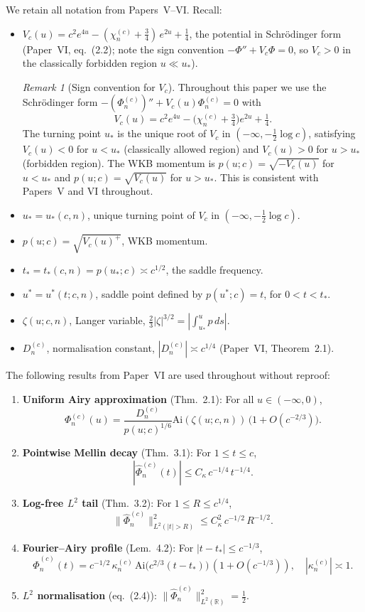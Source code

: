 \documentclass[12pt,a4paper]{amsart}
\theoremstyle{definition}
\theoremstyle{remark}
\newtheorem{remark}[theorem]{Remark}
\newcommand{\Ai}{\mathrm{Ai}}
\newcommand{\ustar}{u_*}
\newcommand{\usaddle}{u^*}
\newcommand{\tstar}{t_*}
\begin{document}
We retain all notation from Papers~V--VI.
Recall:
\begin{itemize}
\item $V_c(u) = c^2 e^{4u}
- (\chi_n^{(c)} + \tfrac{3}{4})\,e^{2u}
+ \tfrac{1}{4}$,
the potential in Schr\"odinger form
(Paper~VI, eq.~(2.2);
note the sign convention
$-\Phi'' + V_c \Phi = 0$,
so $V_c > 0$ in the classically
forbidden region $u \ll \ustar$).

\begin{remark}[Sign convention for $V_c$]
\label{rem:sign}
Throughout this paper we use the
Schr\"odinger form
$-(\Phi_n^{(c)})'' + V_c(u)\Phi_n^{(c)} = 0$
with
\[
V_c(u) = c^2 e^{4u}
- \bigl(\chi_n^{(c)} + \tfrac{3}{4}\bigr)e^{2u}
+ \tfrac{1}{4}.
\]
The turning point $\ustar$ is the unique root
of $V_c$ in $(-\infty, -\tfrac{1}{2}\log c)$,
satisfying $V_c(u) < 0$ for $u < \ustar$
(classically allowed region)
and $V_c(u) > 0$ for $u > \ustar$
(forbidden region).
The WKB momentum is
$p(u;c) = \sqrt{-V_c(u)}$
for $u < \ustar$
and $p(u;c) = \sqrt{V_c(u)}$
for $u > \ustar$.
This is consistent with
Papers~V and VI throughout.
\end{remark}
\item $\ustar = \ustar(c,n)$, unique turning point
of $V_c$ in $(-\infty, -\tfrac12\log c)$.
\item $p(u;c) = \sqrt{V_c(u)^+}$, WKB momentum.
\item $\tstar = t_*(c,n) = p(\ustar;c) \asymp c^{1/2}$,
the saddle frequency.
\item $\usaddle = \usaddle(t;c,n)$, saddle point
defined by $p(\usaddle;c) = t$, for
$0 < t < \tstar$.
\item $\zeta(u;c,n)$, Langer variable,
$\tfrac{2}{3}|\zeta|^{3/2}
= |\int_{\ustar}^u p\,ds|$.
\item $D_n^{(c)}$, normalisation constant,
$|D_n^{(c)}| \asymp c^{1/4}$
(Paper~VI, Theorem~2.1).
\end{itemize}

The following results from Paper~VI are
used throughout without reproof:

\begin{enumerate}[(VI.1)]
\item\label{VI1} \textbf{Uniform Airy approximation}
(Thm.~2.1): For all $u \in (-\infty, 0)$,
\[
\Phi_n^{(c)}(u)
= \frac{D_n^{(c)}}{p(u;c)^{1/6}}
\Ai(\zeta(u;c,n))\,\bigl(1 + O(c^{-2/3})\bigr).
\]
\item\label{VI2} \textbf{Pointwise Mellin decay}
(Thm.~3.1): For $1 \le t \le c$,
\[
|\widehat{\Phi}_n^{(c)}(t)|
\le C_\kappa\,c^{-1/4}\,t^{-1/4}.
\]
\item\label{VI3} \textbf{Log-free $L^2$ tail}
(Thm.~3.2): For $1 \le R \le c^{1/4}$,
\[
\|\widehat{\Phi}_n^{(c)}\|_{L^2(|t|>R)}^2
\le C_\kappa^2\,c^{-1/2}\,R^{-1/2}.
\]
\item\label{VI4} \textbf{Fourier--Airy profile}
(Lem.~4.2): For $|t - \tstar| \le c^{-1/3}$,
\[
\widehat{\Phi}_n^{(c)}(t)
= c^{-1/2}\,\kappa_n^{(c)}\,
\Ai\!\bigl(c^{2/3}(t-\tstar)\bigr)
\,(1 + O(c^{-1/3})),
\quad
|\kappa_n^{(c)}| \asymp 1.
\]
\item\label{VI5} \textbf{$L^2$ normalisation}
(eq.~(2.4)):
$\|\widehat{\Phi}_n^{(c)}\|_{L^2(\mathbb{R})}^2
= \tfrac{1}{2}$.
\end{enumerate}
\end{document}
